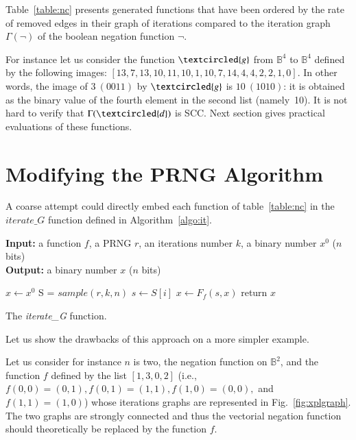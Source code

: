 Table~\ref{table:nc} presents generated functions 
that have been ordered by the rate of removed edges in their
graph of iterations compared to the iteration graph $\Gamma(\neg)$
of the boolean negation function $\neg$.

For instance let us consider  the function $\textcircled{g}$ from $\mathds{B}^4$ to $\mathds{B}^4$
defined by the following images: 
$[13,7,13,10,11,10,1,10,7,14,4,4,2,2,1,0]$.
In other words,  the image of $3 ~(0011)$ by $\textcircled{g}$ is $10 ~(1010)$: it is obtained
as  the  binary  value  of  the  fourth element  in  the  second  list
(namely~10).  It  is not  hard to verify  that $\Gamma(\textcircled{d})$ is  SCC.
Next section gives practical evaluations of these functions.

\section{Modifying the PRNG Algorithm}\label{sec:modif}
A coarse attempt could directly embed each function of table~\ref{table:nc}  
in the $\textit{iterate\_G}$ function defined in Algorithm~\ref{algo:it}.


\begin{algorithm}
\textbf{Input:} a function $f$, a PRNG $r$, 
  an iterations number $k$, a binary number $x^0$ ($n$ bits)\\
\textbf{Output:} a binary number $x$ ($n$ bits)
\begin{algorithmic}[1]
\STATE$x\leftarrow x^0$\;
\STATE S = $\textit{sample}(r,k,n)$\;
{
\STATE$s \leftarrow S[i]$\;
\STATE $x\leftarrow  F_f(s,x) $\;
}\ENDFOR
\STATE return $x$\;
\medskip
\caption{The \textit{iterate\_G} function. }
\label{algo:it}
\end{algorithmic}
\end{algorithm}

Let us show the drawbacks of this approach on a more simpler example.

Let us consider for instance $n$ is two, the negation function on $\mathds{B}^2$, and
the function $f$ defined by the list $[1,3,0,2]$ (i.e., $f(0,0) = (0,1), f(0,1) = (1,1), f(1,0) = (0,0),$ and $f(1,1)=(1,0)$) whose iterations graphs are represented 
in Fig.~\ref{fig:xplgraph}.
The two graphs are strongly connected and thus the vectorial negation function 
should theoretically  be replaced by the function $f$.



